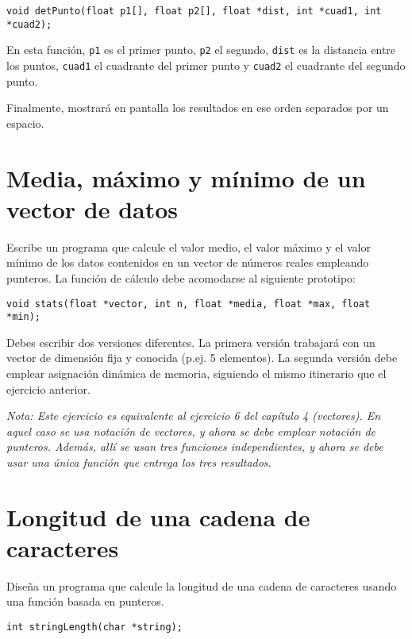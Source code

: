 \documentclass[a4paper]{article}
\begin{document}
\lstset{language=C,label= ,caption= ,captionpos=b,numbers=none}
\begin{lstlisting}
void detPunto(float p1[], float p2[], float *dist, int *cuad1, int *cuad2);
\end{lstlisting}

En esta función, \texttt{p1} es el primer punto, \texttt{p2} el segundo, \texttt{dist} es la distancia entre los puntos, \texttt{cuad1} el cuadrante del primer punto y \texttt{cuad2} el  cuadrante del segundo punto.

Finalmente, mostrará en pantalla los resultados en ese orden separados por un espacio.

\section{Media, máximo y mínimo de un vector de datos}
\label{sec:orgb07bbc0}

Escribe un programa que calcule el valor medio, el valor máximo y el valor mínimo de los datos contenidos en un vector de números reales empleando punteros. La función de cálculo debe acomodarse al siguiente prototipo:

\lstset{language=C,label= ,caption= ,captionpos=b,numbers=none}
\begin{lstlisting}
void stats(float *vector, int n, float *media, float *max, float *min);
\end{lstlisting}

Debes escribir dos versiones diferentes. La primera versión trabajará con un vector de dimensión fija y conocida (p.ej. 5 elementos). La segunda versión debe emplear asignación dinámica de memoria, siguiendo el mismo itinerario que el ejercicio anterior.

\emph{Nota: Este ejercicio es equivalente al ejercicio 6 del capítulo 4 (vectores). En aquel caso se usa notación de vectores, y ahora se debe emplear notación de punteros. Además, allí se usan tres funciones independientes, y ahora se debe usar una única función que entrega los tres resultados.}

\section{Longitud de una cadena de caracteres}
\label{sec:org09640af}

Diseña un programa que calcule la longitud de una cadena de caracteres usando una función basada en punteros.

\lstset{language=C,label= ,caption= ,captionpos=b,numbers=none}
\begin{lstlisting}
int stringLength(char *string);
\end{lstlisting}
\end{document}
